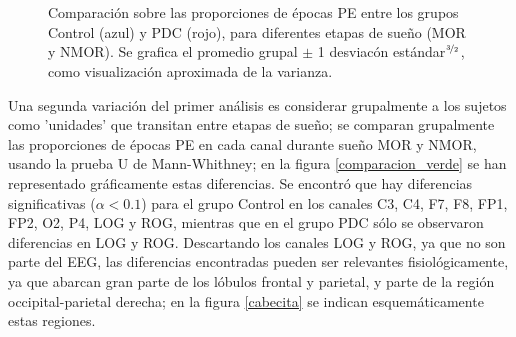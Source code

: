 \documentclass[12pt,a4paper]{mitthesis}
\begin{document}
\begin{figure}
\centering
{}\\
\\
\caption{Comparaci\'on sobre las proporciones de \'epocas PE entre los grupos Control (azul) y PDC 
(rojo), para diferentes etapas de sue\~no (MOR y NMOR). Se grafica el promedio grupal $\pm$ 1 
desviac\'on est\'andar$^{\nicefrac{3}{2}}$, como visualizaci\'on aproximada de la varianza.}
\label{comparacion_graf}
\end{figure}

Una segunda variaci\'on del primer an\'alisis es considerar grupalmente a los sujetos como 
'unidades' que transitan entre etapas de sue\~no; se comparan grupalmente las proporciones de 
\'epocas PE en cada canal durante sue\~no MOR y NMOR, usando la prueba U de Mann-Whithney; en 
la figura \ref{comparacion_verde} se han representado gr\'aficamente estas diferencias.
Se encontr\'o que hay diferencias significativas ($\alpha<0.1$) para el grupo Control en los 
canales C3, C4, F7, F8, FP1, FP2, O2, P4, LOG y ROG, mientras que en el grupo PDC s\'olo se
observaron diferencias en LOG y ROG.
Descartando los canales LOG y ROG, ya que no son parte del EEG, las diferencias encontradas pueden 
ser relevantes fisiol\'ogicamente, ya que abarcan gran parte de los l\'obulos frontal y parietal, 
y parte de la regi\'on occipital-parietal derecha; en la figura \ref{cabecita} se indican 
esquem\'aticamente estas regiones.
\end{document}

